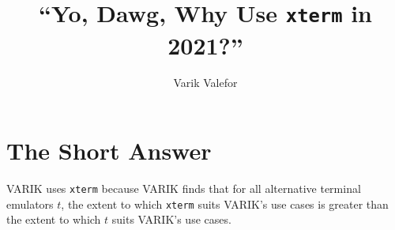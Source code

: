 \documentclass{article}
\title{``Yo, Dawg, Why Use \texttt{xterm} in 2021?''}
\author{Varik Valefor}
\begin{document}
	\maketitle
	\section{The Short Answer}
		VARIK uses \texttt{xterm} because VARIK finds that for all alternative terminal emulators $t$, the extent to which \texttt{xterm} suits VARIK's use cases is greater than the extent to which $t$ suits VARIK's use cases.
\end{document}

